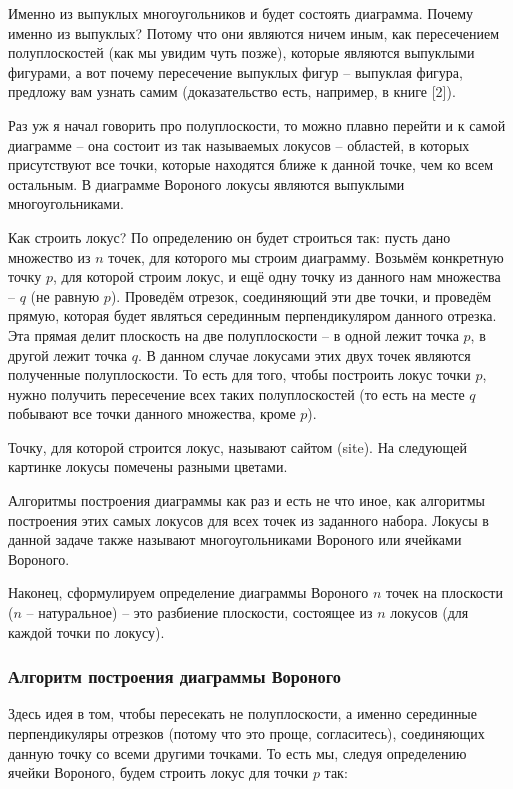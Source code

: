 Именно из выпуклых многоугольников и будет состоять диаграмма. Почему именно из выпуклых? Потому что они являются ничем иным, как пересечением полуплоскостей (как мы увидим чуть позже), которые являются выпуклыми фигурами, а вот почему пересечение выпуклых фигур -- выпуклая фигура, предложу вам узнать самим (доказательство есть, например, в книге [2]).

Раз уж я начал говорить про полуплоскости, то можно плавно перейти и к самой диаграмме -- она состоит из так называемых локусов -- областей, в которых присутствуют все точки, которые находятся ближе к данной точке, чем ко всем остальным. В диаграмме Вороного локусы являются выпуклыми многоугольниками.

Как строить локус? По определению он будет строиться так: пусть дано множество из $n$ точек, для которого мы строим диаграмму. Возьмём конкретную точку $p$, для которой строим локус, и ещё одну точку из данного нам множества -- $q$ (не равную $p$). Проведём отрезок, соединяющий эти две точки, и проведём прямую, которая будет являться серединным перпендикуляром данного отрезка. Эта прямая делит плоскость на две полуплоскости -- в одной лежит точка $p$, в другой лежит точка $q$. В данном случае локусами этих двух точек являются полученные полуплоскости. То есть для того, чтобы построить локус точки $p$, нужно получить пересечение всех таких полуплоскостей (то есть на месте $q$ побывают все точки данного множества, кроме $p$).

Точку, для которой строится локус, называют сайтом (site). На следующей картинке локусы помечены разными цветами.

Алгоритмы построения диаграммы как раз и есть не что иное, как алгоритмы построения этих самых локусов для всех точек из заданного набора. Локусы в данной задаче также называют многоугольниками Вороного или ячейками Вороного.

Наконец, сформулируем определение диаграммы Вороного $n$ точек на плоскости ($n$ -- натуральное) -- это разбиение плоскости, состоящее из $n$ локусов (для каждой точки по локусу). 

\subsubsection{Алгоритм построения диаграммы Вороного}

Здесь идея в том, чтобы пересекать не полуплоскости, а именно серединные перпендикуляры отрезков (потому что это проще, согласитесь), соединяющих данную точку со всеми другими точками. То есть мы, следуя определению ячейки Вороного, будем строить локус для точки $p$ так:

